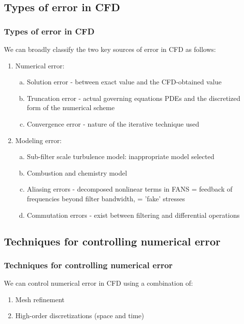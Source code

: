 \documentclass{beamer}
\begin{document}
\subsection{Types of error in CFD}
\begin{frame}%
\frametitle{Types of error in CFD}
\scriptsize
We can broadly classify the two key sources of error in CFD as follows:

\begin{enumerate}[1.]
\item Numerical error:
	\begin{enumerate}[(a)]
	\scriptsize
	\item Solution error - between exact value and the CFD-obtained value
	\item Truncation error - actual governing equations PDEs and the discretized form of the numerical scheme
	\item Convergence error - nature of the iterative technique used
	\end{enumerate}
\item Modeling error:
	\begin{enumerate}[(a)]
	\scriptsize
	\item Sub-filter scale turbulence model: inappropriate model selected
	\item Combustion and chemistry model
	\item Aliasing errors - decomposed nonlinear terms in FANS = feedback of frequencies beyond filter bandwidth, = 'fake' stresses 
	\item Commutation errors - exist between filtering and differential operations 
	\end{enumerate}
\end{enumerate}

\end{frame}



\subsection{Techniques for controlling numerical error}
\begin{frame}%
\frametitle{Techniques for controlling numerical error}
\scriptsize
We can control numerical error in CFD using a combination of:

\begin{enumerate}[1.]
\item Mesh refinement
	
\item High-order discretizations (space and time)
	
\end{enumerate}

\end{frame}
\end{document}
